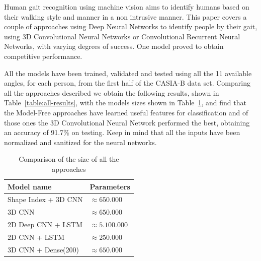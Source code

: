 \documentclass[12pt]{article}
\theoremstyle{definition}
\begin{document}
	Human gait recognition using machine vision aims to identify humans based on their walking style and manner in a non intrusive manner. This paper covers a couple of approaches using Deep Neural Networks to identify people by their gait, using 3D Convolutional Neural Networks or Convolutional Recurrent Neural Networks, with varying degrees of success. One model proved to obtain competitive performance.

	All the models have been trained, validated and tested using all the 11 available angles, for each person, from the first half of the CASIA-B data set. Comparing all the approaches described we obtain the following results, shown in Table~\ref{table:all-results}, with the models sizes shown in Table~\ref{table:all-size}, and find that the Model-Free approaches have learned useful features for classification and of those ones the 3D Convolutional Neural Network performed the best, obtaining an accuracy of 91.7\% on testing. Keep in mind that all the inputs have been normalized and sanitized for the neural networks.

	\begin{table}[h]
		\centering
		\renewcommand{\arraystretch}{1.5}

		\caption{Comparison of the size of all the approaches}
		\label{table:all-size}

		\begin{tabular}{ll}
			\textbf{Model name}  &\textbf{Parameters} \\ \hline
			Shape Index + 3D CNN & $\approx 650.000$   \\ \hline
			3D CNN               & $\approx 650.000$   \\ \hline
			2D Deep CNN + LSTM   & $\approx 5.100.000$ \\ \hline
			2D CNN + LSTM        & $\approx 250.000$   \\ \hline
			3D CNN + Dense(200)  & $\approx 650.000$   \\
		\end{tabular}
	\end{table}
\end{document}
